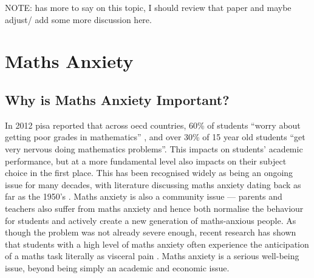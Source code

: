 \documentclass[twoside,12pt,a4paper]{report}
\begin{document}
{\color{red}
NOTE: \cite{King2015} has more to say on this topic, I should review that paper and maybe adjust/ add some more discussion here.
}





\section{Maths Anxiety}


\subsection*{Why is Maths Anxiety Important?}

In 2012 \gls{pisa} reported that across \gls{oecd} countries, 60\% of students ``worry about getting poor grades in mathematics''  \cite{PISA2013}, and over 30\% of 15 year old students ``get very nervous doing mathematics problems''. This impacts on students' academic performance, but at a more fundamental level also impacts on their subject choice in the first place. This has been recognised widely as being an ongoing issue for many decades, with literature discussing maths anxiety dating back as far as the 1950's \cite{Dreger1957}. Maths anxiety is also a community issue --- parents and teachers also suffer from maths anxiety and hence both normalise the behaviour for students and actively create a new generation of maths-anxious people. As though the problem was not already severe enough, recent research has shown that students with a high level of maths anxiety often experience the anticipation of a maths task literally as visceral pain \cite{Lyons2012pain}. Maths anxiety is a serious well-being issue, beyond being simply an academic and economic issue.
\end{document}

